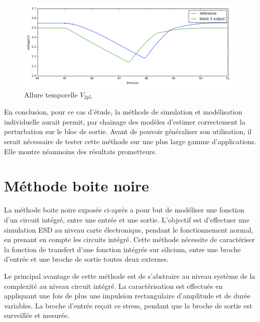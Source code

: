 \begin{figure}[!h]
  \centering
  \includegraphics[width=0.98\textwidth]{src/1/figures/simulation_comparison_block3.png}
  \caption{Allure temporelle $V_{2p5}$}
  \label{fig:sim-compare-block3}
\end{figure}

En conclusion, pour ce cas d'étude, la méthode de simulation et modélisation individuelle aurait permit, par chainage des modèles d'estimer correctement la perturbation sur le bloc de sortie.
Avant de pouvoir généraliser son utilisation, il serait nécessaire de tester cette méthode sur une plus large gamme d'applications.
Elle montre néanmoins des résultats prometteurs.

\section{Méthode boite noire}

La méthode boite noire exposée ci-après a pour but de modéliser une fonction d'un circuit intégré, entre une entrée et une sortie.
L'objectif est d'effectuer une simulation ESD au niveau carte électronique, pendant le fonctionnement normal, en prenant en compte les circuits intégré.
Cette méthode nécessite de caractériser la fonction de transfert d'une fonction intégrée sur silicium, entre une broche d'entrée et une broche de sortie toutes deux externes.

Le principal avantage de cette méthode est de s'abstraire au niveau système de la complexité au niveau circuit intégré.
La caractérisation est effectuée en appliquant une fois de plus une impulsion rectangulaire d'amplitude et de durée variables.
La broche d'entrée reçoit ce stress, pendant que la broche de sortie est surveillée et mesurée.

